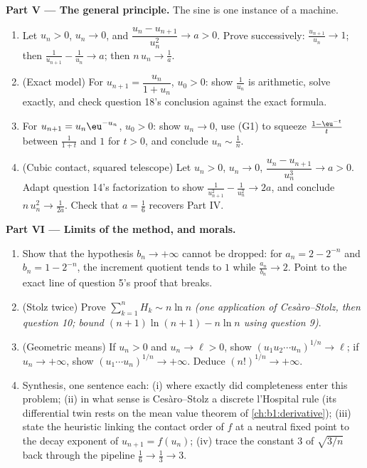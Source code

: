 \begin{problem}[{Weekend problem --- the Ces\`aro--Stolz theorem
and the asymptotics $u_n \sim \sqrt{3/n}$ for $u_{n+1} = \sin
u_n$}]
\medskip
\noindent\textbf{Part V --- The general principle.} The sine is
one instance of a machine.
\begin{enumerate}[resume]
  \item Let $u_n > 0$, $u_n \to 0$, and $\dfrac{u_n -
        u_{n+1}}{u_n^{2}} \to a > 0$. Prove successively:
        $\frac{u_{n+1}}{u_n} \to 1$; then $\frac{1}{u_{n+1}} -
        \frac{1}{u_n} \to a$; then $n\,u_n \to \frac1a$.
  \item (Exact model) For $u_{n+1} = \dfrac{u_n}{1 + u_n}$, $u_0
        > 0$: show $\frac{1}{u_n}$ is arithmetic, solve exactly,
        and check question 18's conclusion against the exact
        formula.
  \item For $u_{n+1} = u_n \eu^{-u_n}$, $u_0 > 0$: show $u_n \to
        0$, use (G1) to squeeze $\frac{1 - \eu^{-t}}{t}$ between
        $\frac{1}{1+t}$ and $1$ for $t > 0$, and conclude $u_n
        \sim \frac 1n$.
  \item (Cubic contact, squared telescope) Let $u_n > 0$, $u_n
        \to 0$, $\dfrac{u_n - u_{n+1}}{u_n^{3}} \to a > 0$.
        Adapt question 14's factorization to show
        $\frac{1}{u_{n+1}^2} - \frac{1}{u_n^2} \to 2a$, and
        conclude $n\,u_n^{2} \to \frac{1}{2a}$. Check that $a =
        \frac16$ recovers Part IV.
\end{enumerate}

\medskip
\noindent\textbf{Part VI --- Limits of the method, and morals.}
\begin{enumerate}[resume]
  \item Show that the hypothesis $b_n \to +\infty$ cannot be
        dropped: for $a_n = 2 - 2^{-n}$ and $b_n = 1 - 2^{-n}$,
        the increment quotient tends to $1$ while $\frac{a_n}
        {b_n} \to 2$. Point to the exact line of question 5's
        proof that breaks.
  \item (Stolz twice) Prove $\sum_{k=1}^{n} H_k \sim n \ln n$
        \emph{(one application of Ces\`aro--Stolz, then question
        10; bound $(n+1)\ln(n+1) - n\ln n$ using question 9)}.
  \item (Geometric means) If $u_n > 0$ and $u_n \to \ell > 0$,
        show $(u_1 u_2 \cdots u_n)^{1/n} \to \ell$; if $u_n \to
        +\infty$, show $(u_1 \cdots u_n)^{1/n} \to +\infty$.
        Deduce $(n!)^{1/n} \to +\infty$.
  \item Synthesis, one sentence each: (i) where exactly did
        completeness enter this problem; (ii) in what sense is
        Ces\`aro--Stolz a discrete l'Hospital rule (its
        differential twin rests on the mean value theorem of
        \cref{ch:b1:derivative}); (iii) state the heuristic
        linking the contact order of $f$ at a neutral fixed
        point to the decay exponent of $u_{n+1} = f(u_n)$;
        (iv) trace the constant $3$ of $\sqrt{3/n}$ back through
        the pipeline $\frac16 \to \frac13 \to 3$.
\end{enumerate}
\end{problem}
